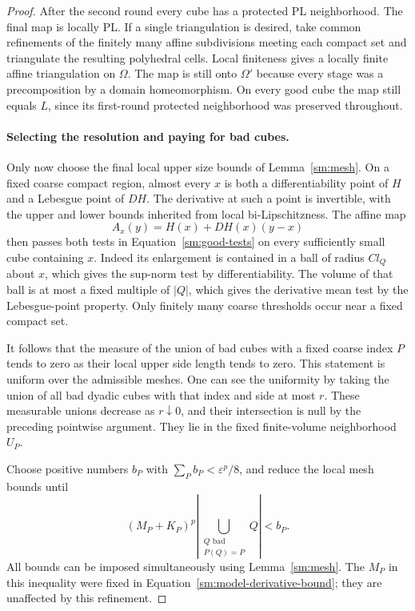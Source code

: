 \documentclass[11pt]{article}
\numberwithin{equation}{section}
\theoremstyle{definition}
\theoremstyle{remark}
\newcommand{\eps}{\varepsilon}
\begin{document}
\begin{proof}
After the second round every cube has a
protected PL neighborhood.  The final map is
locally PL.  If a single triangulation is
desired, take common refinements of the
finitely many affine subdivisions meeting
each compact set and triangulate the resulting
polyhedral cells.  Local finiteness gives a
locally finite affine triangulation on
$\Omega$.  The map is still onto $\Omega'$
because every stage was a precomposition by
a domain homeomorphism.  On every good cube
the map still equals $L$, since its first-round
protected neighborhood was preserved throughout.

\paragraph{Selecting the resolution and paying for bad cubes.}
Only now choose the final local upper size
bounds of Lemma~\ref{sm:mesh}.  On a fixed
coarse compact region, almost every $x$ is
both a differentiability point of $H$ and a
Lebesgue point of $DH$.  The derivative at
such a point is invertible, with the upper
and lower bounds inherited from local
bi-Lipschitzness.  The affine map
\[
 A_x(y)=H(x)+DH(x)(y-x)
\]
then passes both tests in
Equation~\eqref{sm:good-tests} on every sufficiently
small cube containing $x$.  Indeed its
enlargement is contained in a ball of radius
$C l_Q$ about $x$, which gives the sup-norm
test by differentiability.  The volume of
that ball is at most a fixed multiple of
$|Q|$, which gives the derivative mean test
by the Lebesgue-point property.  Only
finitely many coarse thresholds occur near
a fixed compact set.

It follows that the measure of the union of
bad cubes with a fixed coarse index $P$
tends to zero as their local upper side
length tends to zero.  This statement is
uniform over the admissible meshes.  One
can see the uniformity by taking the union
of all bad dyadic cubes with that index
and side at most $r$.  These measurable
unions decrease as $r\downarrow0$, and
their intersection is null by the preceding
pointwise argument.  They lie in the fixed
finite-volume neighborhood $U_P$.

Choose positive numbers $b_P$ with
$\sum_Pb_P<\eps^p/8$, and reduce the
local mesh bounds until
\begin{equation}
 \label{sm:bad-error-budget}
 (M_P+K_P)^p
 \left|\bigcup_{\substack{Q\text{ bad}\\P(Q)=P}}Q\right|
 <b_P.
\end{equation}
All bounds can be imposed simultaneously
using Lemma~\ref{sm:mesh}.  The $M_P$ in
this inequality were fixed in
Equation~\eqref{sm:model-derivative-bound}; they
are unaffected by this refinement.


\end{proof}
\end{document}
